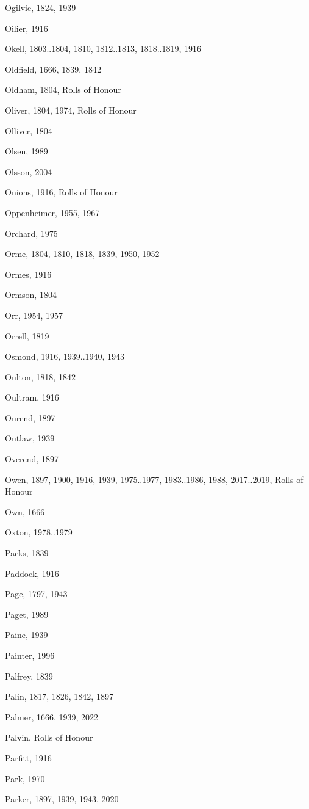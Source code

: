\begin{theindex}
\item Ogilvie, 1824, 1939
\item Oilier, 1916
\item Okell, 1803..1804, 1810, 1812..1813, 1818..1819, 1916
\item Oldfield, 1666, 1839, 1842
\item Oldham, 1804, Rolls of Honour
\item Oliver, 1804, 1974, Rolls of Honour
\item Olliver, 1804
\item Olsen, 1989
\item Olsson, 2004
\item Onions, 1916, Rolls of Honour
\item Oppenheimer, 1955, 1967
\item Orchard, 1975
\item Orme, 1804, 1810, 1818, 1839, 1950, 1952
\item Ormes, 1916
\item Ormson, 1804
\item Orr, 1954, 1957
\item Orrell, 1819
\item Osmond, 1916, 1939..1940, 1943
\item Oulton, 1818, 1842
\item Oultram, 1916
\item Ourend, 1897
\item Outlaw, 1939
\item Overend, 1897
\item Owen, 1897, 1900, 1916, 1939, 1975..1977, 1983..1986, 1988, 2017..2019, Rolls of Honour
\item Own, 1666
\item Oxton, 1978..1979
\item Packs, 1839
\item Paddock, 1916
\item Page, 1797, 1943
\item Paget, 1989
\item Paine, 1939
\item Painter, 1996
\item Palfrey, 1839
\item Palin, 1817, 1826, 1842, 1897
\item Palmer, 1666, 1939, 2022
\item Palvin, Rolls of Honour
\item Parfitt, 1916
\item Park, 1970
\item Parker, 1897, 1939, 1943, 2020

\end{theindex}

